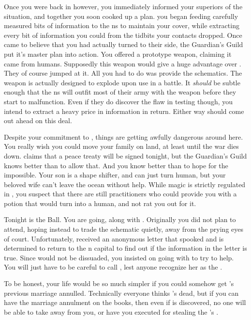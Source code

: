 \documentclass[char]{NeptuneBall}
\begin{document}
Once you were back in \pAtlantis{} however, you immediately informed your superiors of the situation, and together you soon cooked up a plan. you began feeding carefully measured bits of information to the \pPacifica{}ns to maintain your cover, while extracting every bit of information you could from the tidbits your contacts dropped. Once \pPacifica{} came to believe that you had actually turned to their side, the Guardian's Guild put it's master plan into action. You offered \pPacifica{} a prototype weapon, claiming it came from humans. Supposedly this weapon would give \pPacifica{} a huge advantage over \pAtlantis{}. They of course jumped at it.  All you had to do was provide the schematics. The weapon is actually designed to explode upon use in a battle. It \emph{should} be subtle enough that the \pPacifica{}ns will outfit most of their army with the weapon before they start to malfunction. Even if they do discover the flaw in testing though, you intend to extract a heavy price in information in return. Either way \pAtlantis{} should come out ahead on this deal.

Despite your commitment to \pAtlantis{}, things are getting awfully dangerous around here. You really wish you could move your family on land, at least until the war dies down. \cKing{\King} \cKing{} claims that a peace treaty will be signed tonight, but the Guardian's Guild knows better than to allow that. And you know better than to hope for the impossible. Your son is a shape shifter, and can just turn human, but your beloved wife \cQueen{} can't leave the ocean without help. While magic is strictly regulated in \pAtlantis{}, you suspect that there are still practitioners who could provide you with a potion that would turn \cQueen{} into a human, and not rat you out for it.

Tonight is the \cExExKing{} Ball. You are going, along with \cQueen{}. Originally you did not plan to attend, hoping instead to trade the schematic quietly, away from the prying eyes of court. Unfortunately, \cQueen{} received an anonymous letter that spooked \cQueen{\them} and \cQueen{\they} is determined to return to the \pAtlantis{}n capital to find out if the information in the letter is true. Since \cQueen{\they} would not be dissuaded, you insisted on going with \cQueen{\them} to try to help. You will just have to be careful to call \cQueen{\them} \cQueen{\MYname}, lest anyone recognize her as the \cQueen{\King}.

To be honest, your life would be so much simpler if you could somehow get \cQueen{}'s previous marriage annulled. Technically everyone thinks \cQueen{\they}'s dead, but if you can have the marriage annulment on the books, then even if \cQueen{} is discovered, no one will be able to take \cQueen{\them} away from you, or have you executed for stealing the \cKing{\King}'s \cQueen{\spouse}.
\end{document}
